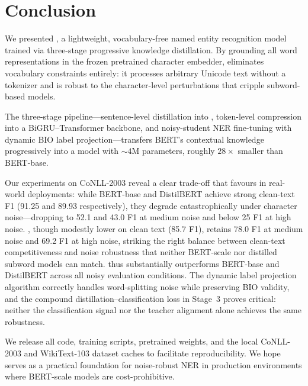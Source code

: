 \section{Conclusion}
\label{sec:conclusion}

We presented \LightRet{}, a lightweight, vocabulary-free named entity
recognition model trained via three-stage progressive knowledge distillation.
By grounding all word representations in the frozen pretrained \RetVec{}
character embedder, \LightRet{} eliminates vocabulary constraints entirely:
it processes arbitrary Unicode text without a tokenizer and is robust to the
character-level perturbations that cripple subword-based models.

The three-stage pipeline---sentence-level distillation into \RetBERT{},
token-level compression into a BiGRU--Transformer backbone, and
noisy-student NER fine-tuning with dynamic BIO label projection---transfers
BERT's contextual knowledge progressively into a model with
${\sim}4$M parameters, roughly $28{\times}$ smaller than BERT-base.

Our experiments on CoNLL-2003 reveal a clear trade-off that favours
\LightRet{} in real-world deployments: while BERT-base and DistilBERT
achieve strong clean-text F1 (91.25 and 89.93 respectively), they degrade
catastrophically under character noise---dropping to 52.1 and 43.0 F1 at
medium noise and below 25 F1 at high noise.
\LightRet{}, though modestly lower on clean text (85.7 F1), retains 78.0 F1
at medium noise and 69.2 F1 at high noise, striking the right balance
between clean-text competitiveness and noise robustness that neither
BERT-scale nor distilled subword models can match.
\LightRet{} thus substantially outperforms BERT-base and DistilBERT across
all noisy evaluation conditions.  The dynamic label projection
algorithm correctly handles word-splitting noise while preserving BIO validity,
and the compound distillation--classification loss in Stage~3 proves critical:
neither the classification signal nor the teacher alignment alone achieves
the same robustness.

We release all code, training scripts, pretrained weights, and the local
CoNLL-2003 and WikiText-103 dataset caches to facilitate reproducibility.
We hope \LightRet{} serves as a practical foundation for noise-robust NER in
production environments where BERT-scale models are cost-prohibitive.
